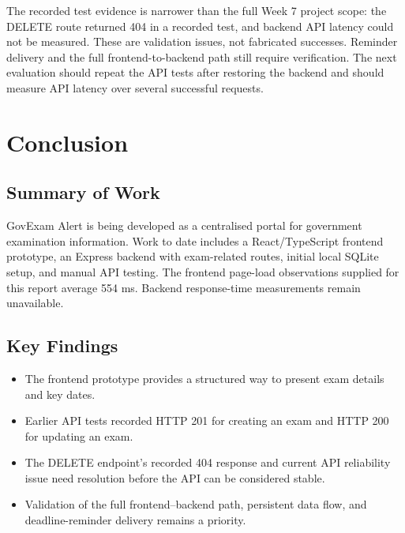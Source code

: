 \documentclass[12pt,a4paper]{report}
\begin{document}
The recorded test evidence is narrower than the full Week 7 project scope: the DELETE route returned 404 in a recorded test, and backend API latency could not be measured. These are validation issues, not fabricated successes. Reminder delivery and the full frontend-to-backend path still require verification. The next evaluation should repeat the API tests after restoring the backend and should measure API latency over several successful requests.

\chapter{Conclusion}

\section{Summary of Work}
GovExam Alert is being developed as a centralised portal for government examination information. Work to date includes a React/TypeScript frontend prototype, an Express backend with exam-related routes, initial local SQLite setup, and manual API testing. The frontend page-load observations supplied for this report average 554 ms. Backend response-time measurements remain unavailable.

\section{Key Findings}
\begin{itemize}
  \item The frontend prototype provides a structured way to present exam details and key dates.
  \item Earlier API tests recorded HTTP 201 for creating an exam and HTTP 200 for updating an exam.
  \item The DELETE endpoint's recorded 404 response and current API reliability issue need resolution before the API can be considered stable.
  \item Validation of the full frontend--backend path, persistent data flow, and deadline-reminder delivery remains a priority.
\end{itemize}
\end{document}
